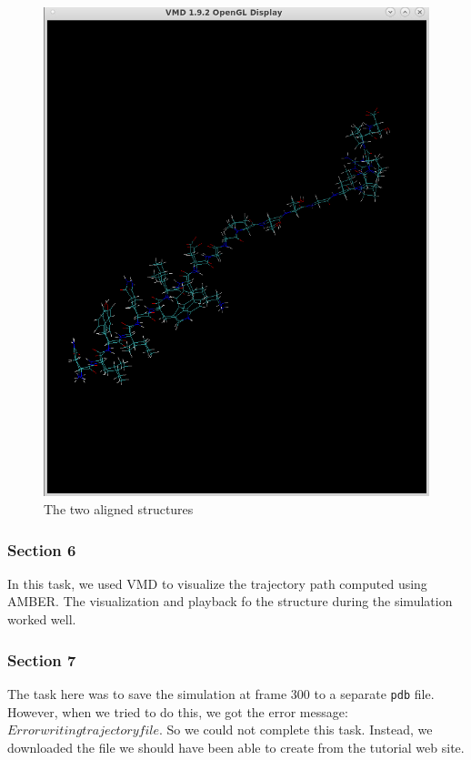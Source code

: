 \documentclass[11pt]{article}
\makeatletter
\def\maxwidth{\ifdim\Gin@nat@width>\linewidth\linewidth
    \else\Gin@nat@width\fi}
\let\Oldincludegraphics\includegraphics
\renewcommand{\includegraphics}[1]{\Oldincludegraphics[width=.8\maxwidth]{#1}}
\makeatother
\begin{document}
\begin{figure}
\centering
\includegraphics{Screenshot_algined.png}
\caption{The two aligned structures}
\end{figure}

\subsubsection{Section 6}\label{section-6}

In this task, we used VMD to visualize the trajectory path computed
using AMBER. The visualization and playback fo the structure during the
simulation worked well.

\subsubsection{Section 7}\label{section-7}

The task here was to save the simulation at frame 300 to a separate
\texttt{pdb} file. However, when we tried to do this, we got the error
message: \(Error writing trajectory file\). So we could not complete
this task. Instead, we downloaded the file we should have been able to
create from the tutorial web site.
\end{document}
